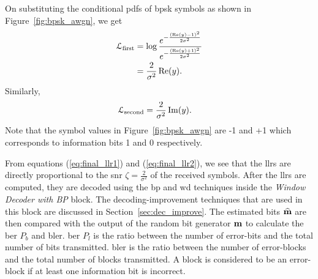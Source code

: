 On substituting the conditional \acp{pdf} of \ac{bpsk} symbols as shown in Figure~\ref{fig:bpsk_awgn}, we get
\begin{align}
\mathcal{L}_{\text{first}}&=\log\frac{e^{-\frac{(\operatorname{Re}(y)-1)^2}{2\sigma^2}}}{e^{-\frac{(\operatorname{Re}(y)+1)^2}{2\sigma^2}}}\\
&=\frac{2}{\sigma^2}\operatorname{Re}(y)\label{eq:final_llr1}.
\end{align}
Similarly,
\begin{align}
\mathcal{L}_{\text{second}}&=\frac{2}{\sigma^2}\operatorname{Im}(y)\label{eq:final_llr2}.
\end{align}
Note that the symbol values in Figure~\ref{fig:bpsk_awgn} are -1 and +1 which corresponds to information bits 1 and 0 respectively.

From equations (\ref{eq:final_llr1}) and (\ref{eq:final_llr2}), we see that the \acp{llr} are directly proportional to the \ac{snr} $\zeta=\frac{2}{\sigma^2}$ of the received symbols. After the \acp{llr} are computed, they are decoded using the \ac{bp} and \ac{wd} techniques inside the \emph{Window Decoder with BP} block. The decoding-improvement techniques that are used in this block are discussed in Section~\ref{sec:dec_improve}. The estimated bits $\widehat{\mathbf{m}}$ are then compared with the output of the random bit generator $\mathbf{m}$ to calculate the \ac{ber} $P_b$ and \ac{bler}. \ac{ber} $P_l$ is the ratio between the number of error-bits and the total number of bits transmitted. \ac{bler} is the ratio between the number of error-blocks and the total number of blocks transmitted. A block is considered to be an error-block if at least one information bit is incorrect.